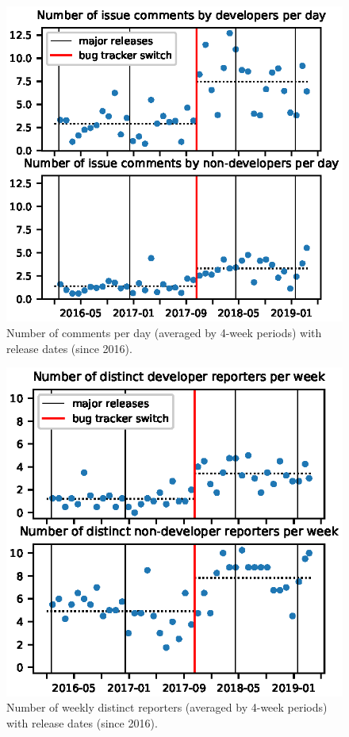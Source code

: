 \documentclass[conference]{IEEEtran}
\begin{document}
\begin{figure}
\includegraphics{comments_with_releases.eps}
\caption{Number of comments per day (averaged by 4-week periods) with release dates (since 2016).} \label{comments_with_releases}
\end{figure}

\begin{figure}
\includegraphics{reporters_with_releases.eps}
\caption{Number of weekly distinct reporters (averaged by 4-week periods) with release dates (since 2016).} \label{reporters_with_releases}
\end{figure}
\end{document}

